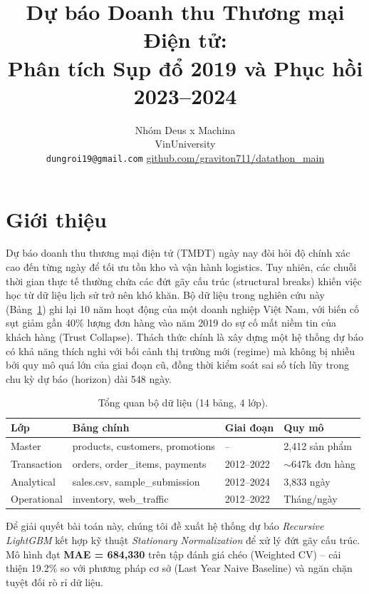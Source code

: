 \documentclass{article}
\title{Dự báo Doanh thu Thương mại Điện tử:\\
Phân tích Sụp đổ 2019 và Phục hồi 2023--2024}
\author{
  Nhóm Deus x Machina \\
  VinUniversity \\
  \texttt{dungroi19@gmail.com} \quad
  \href{https://github.com/graviton711/datathon\_main}{github.com/graviton711/datathon\_main}
}
\begin{document}
\maketitle

\section{Giới thiệu}

Dự báo doanh thu thương mại điện tử (TMĐT) ngày nay đòi hỏi độ chính xác cao đến từng ngày để tối ưu tồn kho và vận hành logistics. Tuy nhiên, các chuỗi thời gian thực tế thường chứa các đứt gãy cấu trúc (structural breaks) khiến việc học từ dữ liệu lịch sử trở nên khó khăn. Bộ dữ liệu trong nghiên cứu này (Bảng~\ref{tab:data}) ghi lại 10 năm hoạt động của một doanh nghiệp Việt Nam, với biến cố sụt giảm gần 40\% lượng đơn hàng vào năm 2019 do sự cố mất niềm tin của khách hàng (Trust Collapse). Thách thức chính là xây dựng một hệ thống dự báo có khả năng thích nghi với bối cảnh thị trường mới (regime) mà không bị nhiễu bởi quy mô quá lớn của giai đoạn cũ, đồng thời kiểm soát sai số tích lũy trong chu kỳ dự báo (horizon) dài 548 ngày.

\begin{table}[h]
\centering
\caption{Tổng quan bộ dữ liệu (14 bảng, 4 lớp).}
\label{tab:data}
\small\setlength\tabcolsep{4pt}
\begin{tabular}{llll}
\toprule
\textbf{Lớp} & \textbf{Bảng chính} & \textbf{Giai đoạn} & \textbf{Quy mô} \\
\midrule
Master      & products, customers, promotions & --        & 2,412 sản phẩm \\
Transaction & orders, order\_items, payments  & 2012--2022 & $\sim$647k đơn hàng \\
Analytical  & sales.csv, sample\_submission   & 2012--2024 & 3{,}833 ngày \\
Operational & inventory, web\_traffic         & 2012--2022 & Tháng/ngày \\
\bottomrule
\end{tabular}
\end{table}

Để giải quyết bài toán này, chúng tôi đề xuất hệ thống dự báo \emph{Recursive LightGBM} kết hợp
kỹ thuật \emph{Stationary Normalization} để xử lý đứt gãy cấu trúc. Mô hình đạt
\textbf{MAE = 684{,}330} trên tập đánh giá chéo (Weighted CV) -- cải thiện 19.2\% so với
phương pháp cơ sở (Last Year Naive Baseline) và ngăn chặn tuyệt đối rò rỉ dữ liệu.
\end{document}
